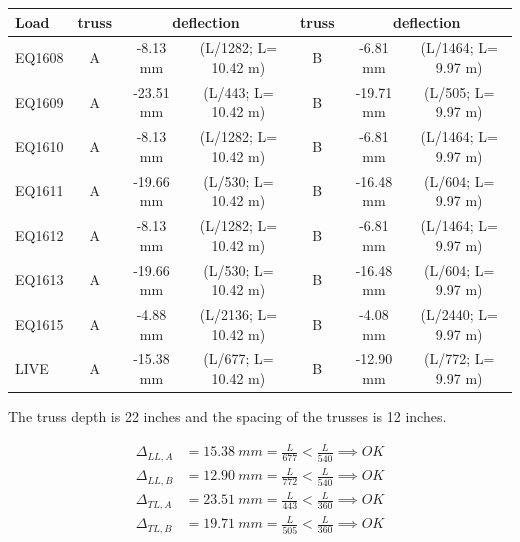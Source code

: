 \begin{center}
  \begin{scriptsize}
  \begin{tabular}{|l|c|c|c|c|c|c|}
    \hline
    \textbf{Load} & \textbf{truss} & \multicolumn{2}{c|}{\textbf{deflection}} & \textbf{truss} & \multicolumn{2}{c|}{\textbf{deflection}} \\
    \hline
EQ1608& A &-8.13  mm & (L/1282; L= 10.42 m) & B &  -6.81  mm & (L/1464; L= 9.97 m)\\
EQ1609& A &-23.51  mm & (L/443; L= 10.42 m) & B &  -19.71  mm & (L/505; L= 9.97 m)\\
EQ1610& A &-8.13  mm & (L/1282; L= 10.42 m) & B &  -6.81  mm & (L/1464; L= 9.97 m)\\
EQ1611& A &-19.66  mm & (L/530; L= 10.42 m) & B &  -16.48  mm & (L/604; L= 9.97 m)\\
EQ1612& A &-8.13  mm & (L/1282; L= 10.42 m) & B &  -6.81  mm & (L/1464; L= 9.97 m)\\
EQ1613& A &-19.66  mm & (L/530; L= 10.42 m) & B &  -16.48  mm & (L/604; L= 9.97 m)\\
EQ1615& A &-4.88  mm & (L/2136; L= 10.42 m) & B &  -4.08  mm & (L/2440; L= 9.97 m)\\
LIVE& A &-15.38  mm & (L/677; L= 10.42 m) & B & -12.90  mm & (L/772; L= 9.97 m)\\
\hline
  \end{tabular}
  \end{scriptsize}
\end{center}

\noindent The truss depth is 22 inches and the spacing of the trusses is 12 inches.

\begin{align}
\Delta_{LL,A} &= 15.38\ mm= \frac{L}{677} < \frac{L}{540} \implies OK \\
\Delta_{LL,B} &= 12.90\ mm= \frac{L}{772} < \frac{L}{540} \implies OK \\
\Delta_{TL,A} &= 23.51\ mm= \frac{L}{443} < \frac{L}{360} \implies OK \\
\Delta_{TL,B} &= 19.71\ mm= \frac{L}{505} < \frac{L}{360} \implies OK
\end{align}

